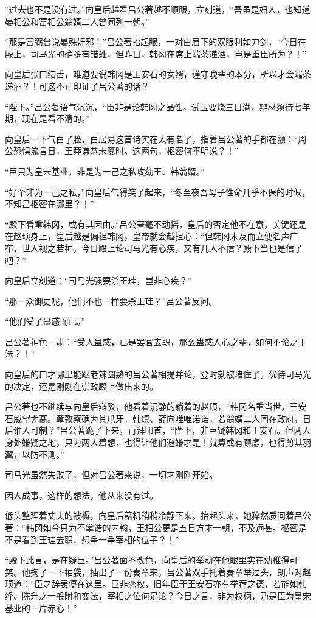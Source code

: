 “过去也不是没有过。”向皇后越看吕公著越不顺眼，立刻道，“吾虽是妇人，也知道晏相公和富相公翁婿二人曾同列一朝。”

“那是富弼曾说晏殊奸邪！”吕公著抬起眼，一对白眉下的双眼利如刀剑，“今日在殿上，司马光的确多有错处，但昨日，韩冈在席上端茶递酒，岂是重臣所为？！”

向皇后张口结舌，难道要说韩冈是王安石的女婿，谨守晚辈的本分，所以才会端茶递酒？！可这不正印证了吕公著的话？

“陛下。”吕公著语气沉沉，“臣非是论韩冈之品性。试玉要烧三日满，辨材须待七年期，现在是看不清的。”

向皇后一下气白了脸，白居易这首诗实在太有名了，指着吕公著的手都在颤：“周公恐惧流言日，王莽谦恭未篡时。这两句，枢密何不明说？！”

“臣只为皇宋基业，非是为一己之私攻劾王、韩翁婿。”

“好个非为一己之私，”向皇后气得笑了起来，“冬至夜吾母子性命几乎不保的时候，不知吕枢密在哪里？！”

“殿下看重韩冈，或有其因由。”吕公著毫不动摇，皇后的否定他不在意，关键还是在赵顼身上，皇后越是偏袒韩冈，皇帝就会越担心：“但韩冈未及而立便名声广布，世人视之若神。今日殿上论司马光有心疾，又有几人不信？殿下当也是信了吧？”

向皇后立刻道：“司马光强要杀王珪，岂非心疾？”

“那一众御史呢，他们不也一样要杀王珪？”吕公著反问。

“他们受了蛊惑而已。”

吕公著神色一肃：“受人蛊惑，已是罢官去职，那么蛊惑人心之辈，如何不论之于法？！”

向皇后的口才哪里能跟老辣圆熟的吕公著相提并论，登时就被堵住了。优待司马光的决定，还是刚刚在崇政殿上做出来的。

吕公著也不继续与向皇后辩驳，他看着沉静的躺着的赵顼，“韩冈名重当世，王安石威望尤髙。章敦蔡确为其爪牙，韩缜、薛向唯唯诺诺，若翁婿二人同在政府，日后谁人可制？”吕公著跪了下来，再拜叩首，“陛下，非臣疑韩冈和王安石。但两人身处嫌疑之地，只为两人着想，也得让他们避嫌才是！就算或有顾虑，也得剪其羽翼，以防不测。”

司马光虽然失败了，但对吕公著来说，一切才刚刚开始。

因人成事，这样的想法，他从来没有过。

低头整理着丈夫的被褥，向皇后藉机稍稍冷静下来。抬起头来，她猝然质问着吕公著：“韩冈如今只为不掌诰的内翰，王相公更是五日方才一朝，不及远甚。枢密是不是看到王珪去职，想争一争宰相的位子？！”

“殿下此言，是在疑臣。”吕公著面不改色，向皇后的举动在他眼里实在幼稚得可笑。他掏了一下袖袋，抽出了一份奏章来。吕公著双手托着奏章举过头，朗声对赵顼道：“臣之辞表便在这里。臣非恋权，旧年臣于王安石亦有举荐之德，若能如韩绛、陈升之一般附和变法，宰相之位何足论？今日之言，非为权柄，乃是臣为皇宋基业的一片赤心！”

